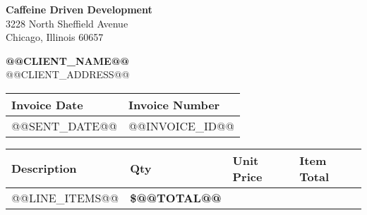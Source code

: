 \documentclass[11pt]{article}
\begin{document}
    \begin{center}
    {\Huge \textbf{Caffeine Driven Development}} \\
    \vspace{0.2cm}
    3228 North Sheffield Avenue \\
    Chicago, Illinois 60657
    \end{center}

    \vspace{1cm}

    \noindent
    \begin{minipage}{0.45\linewidth}
        \textbf{@@CLIENT_NAME@@} \\
        @@CLIENT_ADDRESS@@  \\
    \end{minipage}
    \hfill
    \begin{minipage}{0.45\linewidth}
        \raggedleft
        \begin{tabular}{| C{3cm} | C{3cm} |}
            \hline
            \textbf{Invoice Date} & \textbf{Invoice Number} \\
            \hline
            @@SENT_DATE@@ & @@INVOICE_ID@@ \\
            \hline
        \end{tabular}
    \end{minipage}

    \vspace{1cm}

    \renewcommand{\arraystretch}{1.3}
    \begin{tabular}{| m{8cm} | R{1cm} | R{2cm} | R{2cm} |}
        \hline
        \textbf{Description} & \textbf{Qty} & \textbf{Unit Price} & \textbf{Item Total} \\
        \hline
        @@LINE_ITEMS@@
         &   \textbf{\$@@TOTAL@@} \\
    \end{tabular}
\end{document}
